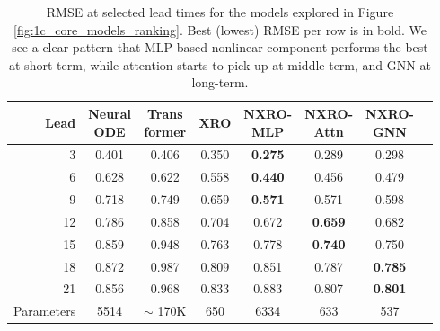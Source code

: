 \begin{table}[t]
\centering
\setlength{\tabcolsep}{3.5pt} %
\renewcommand{\arraystretch}{1.15}
\begin{tabular}{rccc@{\hspace{6pt}\vrule\hspace{6pt}}cccc}
\toprule
Lead & \shortstack{Neural\\ODE} & \shortstack{Trans\\former} & XRO & \shortstack{NXRO-\\MLP} & \shortstack{NXRO-\\Attn} & \shortstack{NXRO-\\GNN} \\
\midrule
3  & 0.401 & 0.406 & 0.350 & \textbf{0.275} & 0.289 & 0.298 \\
6  & 0.628 & 0.622 & 0.558 & \textbf{0.440} & 0.456 & 0.479 \\
9  & 0.718 & 0.749 & 0.659 & \textbf{0.571} & 0.571 & 0.598 \\
12 & 0.786 & 0.858 & 0.704 & 0.672 & \textbf{0.659} & 0.682 \\
15 & 0.859 & 0.948 & 0.763 & 0.778 & \textbf{0.740} & 0.750 \\
18 & 0.872 & 0.987 & 0.809 & 0.851 & 0.787 & \textbf{0.785} \\
21 & 0.856 & 0.968 & 0.833 & 0.883 & 0.807 & \textbf{0.801} \\
\midrule
Parameters & 5514 & $\sim$ 170K & 650 & 6334 & 633 & 537 \\
\bottomrule
\end{tabular}
\caption{RMSE at selected lead times  for the models explored in Figure \ref{fig:1c_core_models_ranking}. Best (lowest) RMSE per row is in bold. We see a clear pattern that MLP based nonlinear component performs the best at short-term, while attention starts to pick up at middle-term, and GNN at long-term.}
\label{tab:rmse_selected}
\end{table}